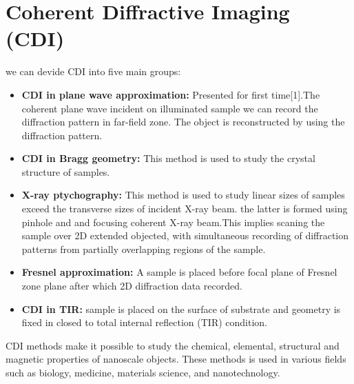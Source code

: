\documentclass[12pt, a4paper, twocolumn]{article}
\begin{document}
\section{Coherent Diffractive Imaging (CDI)}
	we can devide CDI into five main groups:
	\begin{itemize}
		\item \textbf{CDI in plane wave approximation:} Presented for first time[1].The coherent plane wave incident on illuminated sample we can record the diffraction pattern in far-field zone. The object is reconstructed by using the diffraction pattern.
		\item \textbf{CDI in Bragg geometry:} This method is used to study the crystal structure of samples. 
		\item \textbf{X-ray ptychography:} This method is used to study linear sizes of samples exceed the transverse sizes of incident X-ray beam. the latter is formed using pinhole and and focusing coherent X-ray beam.This implies scaning the sample over 2D extended objected, with simultaneous recording of diffraction patterns from partially overlapping regions of the sample.
		\item \textbf{Fresnel approximation:} A sample is placed before focal plane of Fresnel zone plane after which 2D diffraction data recorded.
		\item \textbf{CDI in TIR:} sample is placed on the surface of substrate and geometry is fixed in closed to total internal reflection (TIR) condition. 
	
	\end{itemize}
	CDI methods make it possible to study the chemical, elemental, structural and magnetic properties of nanoscale objects. These methods is used in various fields such as biology, medicine, materials science, and nanotechnology.
	
	
\end{document}
